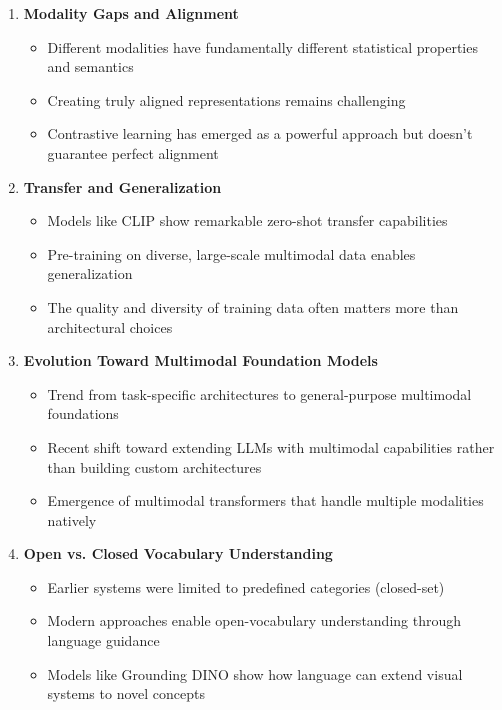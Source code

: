 \begin{enumerate}
    \item \textbf{Modality Gaps and Alignment}
    \begin{itemize}
        \item Different modalities have fundamentally different statistical properties and semantics
        \item Creating truly aligned representations remains challenging
        \item Contrastive learning has emerged as a powerful approach but doesn't guarantee perfect alignment
    \end{itemize}
    
    \item \textbf{Transfer and Generalization}
    \begin{itemize}
        \item Models like CLIP show remarkable zero-shot transfer capabilities
        \item Pre-training on diverse, large-scale multimodal data enables generalization
        \item The quality and diversity of training data often matters more than architectural choices
    \end{itemize}
    
    \item \textbf{Evolution Toward Multimodal Foundation Models}
    \begin{itemize}
        \item Trend from task-specific architectures to general-purpose multimodal foundations
        \item Recent shift toward extending LLMs with multimodal capabilities rather than building custom architectures
        \item Emergence of multimodal transformers that handle multiple modalities natively
    \end{itemize}
    
    \item \textbf{Open vs. Closed Vocabulary Understanding}
    \begin{itemize}
        \item Earlier systems were limited to predefined categories (closed-set)
        \item Modern approaches enable open-vocabulary understanding through language guidance
        \item Models like Grounding DINO show how language can extend visual systems to novel concepts
    \end{itemize}
    

\end{enumerate}
